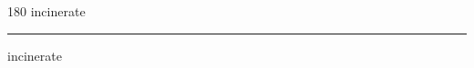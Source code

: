 
\begin{frame}
\begin{center}
\begin{turn}{180}
{\fontsize{2.5cm}{1em}\selectfont incinerate}
\end{turn}
\vspace{1em}\par  
\hrule
\vspace{1em}\par  
{\fontsize{2.5cm}{1em}\selectfont incinerate}
\end{center}
\end{frame}
